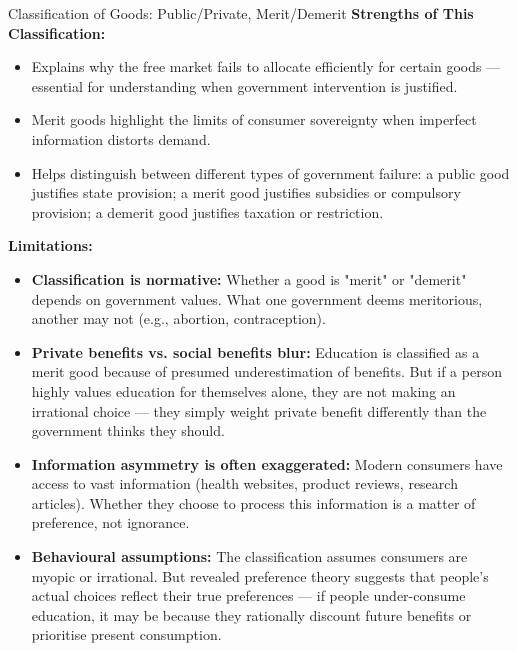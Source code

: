 \documentclass[11pt, a4paper, twoside]{book}
\begin{document}
\begin{evaluation}{Classification of Goods: Public/Private, Merit/Demerit}
\textbf{Strengths of This Classification:}
\begin{itemize}[leftmargin=*, nosep]
\item Explains why the free market fails to allocate efficiently for certain goods — essential for understanding when government intervention is justified.
\item Merit goods highlight the limits of consumer sovereignty when imperfect information distorts demand.
\item Helps distinguish between different types of government failure: a public good justifies state provision; a merit good justifies subsidies or compulsory provision; a demerit good justifies taxation or restriction.
\end{itemize}

\textbf{Limitations:}
\begin{itemize}[leftmargin=*, nosep]
\item \textbf{Classification is normative:} Whether a good is "merit" or "demerit" depends on government values. What one government deems meritorious, another may not (e.g., abortion, contraception).
\item \textbf{Private benefits vs. social benefits blur:} Education is classified as a merit good because of presumed underestimation of benefits. But if a person highly values education for themselves alone, they are not making an irrational choice — they simply weight private benefit differently than the government thinks they should.
\item \textbf{Information asymmetry is often exaggerated:} Modern consumers have access to vast information (health websites, product reviews, research articles). Whether they choose to process this information is a matter of preference, not ignorance.
\item \textbf{Behavioural assumptions:} The classification assumes consumers are myopic or irrational. But revealed preference theory suggests that people's actual choices reflect their true preferences — if people under-consume education, it may be because they rationally discount future benefits or prioritise present consumption.
\end{itemize}


\end{evaluation}
\end{document}
